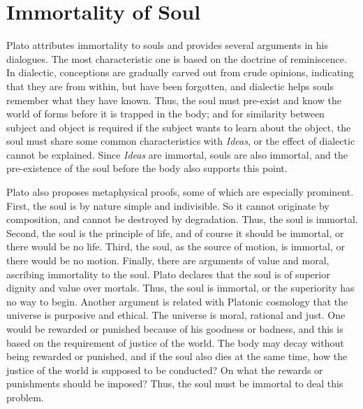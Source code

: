 \documentclass[11pt]{article}
\begin{document}
\begin{sloppypar}
\section{Immortality of Soul}
Plato attributes immortality to souls and provides several arguments in his dialogues. 
The most characteristic one is based on the doctrine of reminiscence. 
In dialectic, conceptions are gradually carved out from crude opinions, indicating that they are from within, but have been forgotten, and dialectic helps souls remember what they have known. 
Thus, the soul must pre-exist and know the world of forms before it is trapped in the body; 
and for similarity between subject and object is required if the subject wants to learn about the object, the soul must share some common characteristics with \textit{Ideas}, or the effect of dialectic cannot be explained. 
Since \textit{Ideas} are immortal, souls are also immortal, and the pre-existence of the soul before the body also supports this point.

\newline

Plato also proposes metaphysical proofs, some of which are especially prominent. 
First, the soul is by nature simple and indivisible. 
So it cannot originate by composition, and cannot be destroyed by degradation. 
Thus, the soul is immortal. 
Second, the soul is the principle of life, and of course it should be immortal, or there would be no life. 
Third, the soul, as the source of motion, is immortal, or there would be no motion.
Finally, there are arguments of value and moral, ascribing immortality to the soul. 
Plato declares that the soul is of superior dignity and value over mortals. 
Thus, the soul is immortal, or the superiority has no way to begin. 
Another argument is related with Platonic cosmology that the universe is purposive and ethical. 
The universe is moral, rational and just. 
One would be rewarded or punished because of his goodness or badness, and this is based on the requirement of justice of the world. 
The body may decay without being rewarded or punished, and if the soul also dies at the same time, how the justice of the world is supposed to be conducted? 
On what the rewards or punishments should be imposed? 
Thus, the soul must be immortal to deal this problem.

\newline


\end{sloppypar}
\end{document}
